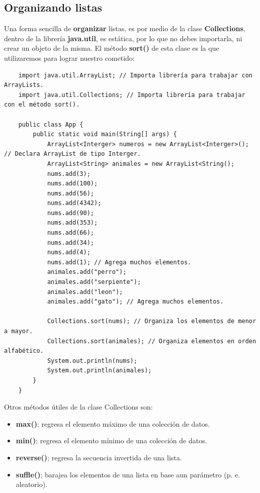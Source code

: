 \subsection{Organizando listas}
\hspace{0.55cm}Una forma sencilla de \textbf{organizar} listas, es por medio de la clase \textbf{Collections}, dentro de la librería \textbf{java.util}, es estática, por lo que no debes importarla, ni crear un objeto de la misma. El método \textbf{sort()} de esta clase es la que utilizaremos para lograr nuestro cometido:
\begin{lstlisting}
    import java.util.ArrayList; // Importa librería para trabajar con ArrayLists.
    import java.util.Collections; // Importa librería para trabajar con el método sort().
    
    public class App {
        public static void main(String[] args) {
            ArrayList<Interger> numeros = new ArrayList<Interger>(); // Declara ArrayList de tipo Interger.
            ArrayList<String> animales = new ArrayList<String();
            nums.add(3);
            nums.add(100);
            nums.add(56);
            nums.add(4342);
            nums.add(90);
            nums.add(353);
            nums.add(66);
            nums.add(34);
            nums.add(4);
            nums.add(1); // Agrega muchos elementos.
            animales.add("perro");
            animales.add("serpiente");
            animales.add("leon");
            animales.add("gato"); // Agrega muchos elementos.
            
            Collections.sort(nums); // Organiza los elementos de menor a mayor.
            Collections.sort(animales); // Organiza elementos en orden alfabético.
            System.out.println(nums);
            System.out.println(animales);
        }
    }
\end{lstlisting}

Otros métodos útiles de la clase Collections son:
\begin{itemize}
    \item \textbf{max()}; regresa el elemento máximo de una colección de datos.
    \item \textbf{min()}; regresa el elemento mínimo de una colección de datos.
    \item \textbf{reverse()}; regresa la secuencia invertida de una lista.
    \item \textbf{suffle()}; barajea los elementos de una lista en base aun parámetro (p. e. aleatorio).
\end{itemize}


